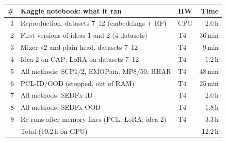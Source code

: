 \begin{tabular}{rp{}lr}
\toprule
\# & Kaggle notebook: what it ran & HW & Time \\
\midrule
1 & Reproduction, datasets 7--12 (embeddings + RF) & CPU & 2.0\,h \\
2 & First versions of ideas 1 and 2 (4 datasets) & T4 & 36\,min \\
3 & Mixer v2 and plain head, datasets 7--12 & T4 & 9\,min \\
4 & Idea 2 on CAP; LoRA on datasets 7--12 & T4 & 1.2\,h \\
5 & All methods: SCP1/2, EMOPain, MP8/50, HHAR & T4 & 48\,min \\
6 & PCL-ID/OOD (stopped, out of RAM) & T4 & 25\,min \\
7 & All methods: SEDFx-ID & T4 & 2.0\,h \\
8 & All methods: SEDFx-OOD & T4 & 1.8\,h \\
9 & Re-runs after memory fixes (PCL, LoRA, idea 2) & T4 & 3.3\,h \\
\midrule
& Total (10.2\,h on GPU) & & 12.2\,h \\
\bottomrule
\end{tabular}
